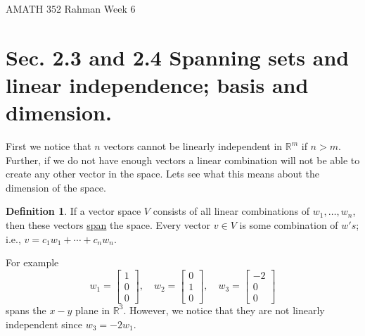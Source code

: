 \documentclass[reqno]{amsart}
\theoremstyle{definition}
\newtheorem{definition}{Definition}
\begin{document}
\begin{flushleft}
{\sc \Large AMATH 352 Rahman} \hfill Week 6
\bigskip
\end{flushleft}

\newcommand{\R}{\mathbb{R}}
\newcommand{\N}{\mathbb{N}}
\newcommand{\Z}{\mathbb{Z}}
\newcommand{\Q}{\mathbb{Q}}
\renewcommand{\CancelColor}{\color{red}}
\newcommand{\?}{\stackrel{?}{=}}
\renewcommand{\varphi}{\phi}
\newcommand{\card}{\text{Card}}
\newcommand{\bigzero}{\text{\Huge 0}}
\newcommand{\curvearrowdown}{{\color{red}\rotatebox{90}{$\curvearrowleft$}}}
\newcommand{\curvearrowup}{{\color{red}\rotatebox{90}{$\curvearrowright$}}}



\section*{Sec. 2.3 and 2.4  Spanning sets and linear independence; basis and dimension.}

First we notice that $n$ vectors cannot be linearly independent in $\R^m$ if $n > m$.
Further, if we do not have enough vectors a linear combination will not be able to create
any other vector in the space.  Lets see what this means about the dimension of the space.

\begin{definition}
If a vector space $V$ consists of all linear combinations of $w_1,\ldots,w_n$, then these vectors \underline{span}
the space.  Every vector $v \in V$ is some combination of $w's$; i.e., $v = c_1w_1 + \cdots + c_nw_n$.
\end{definition}

For example
%
\begin{equation*}
w_1 = \begin{bmatrix}
1\\
0\\
0
\end{bmatrix},\quad w_2 = \begin{bmatrix}
0\\
1\\
0
\end{bmatrix},\quad w_3 = \begin{bmatrix}
-2\\
0\\
0
\end{bmatrix}
\end{equation*}
%
spans the $x-y$ plane in $\R^3$.  However, we notice that they are not linearly independent
since $w_3 = -2w_1$.
\end{document}
